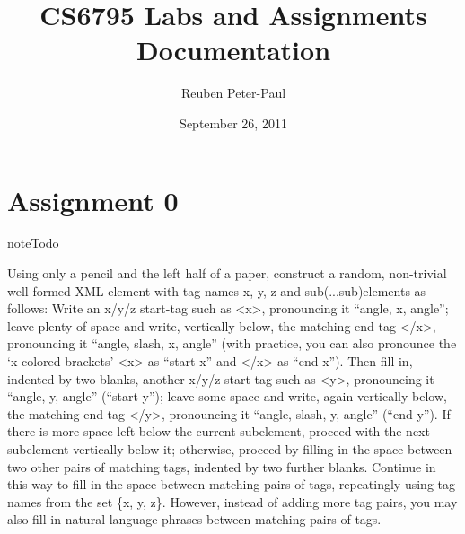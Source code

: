 \documentclass[letterpaper,10pt,english]{sphinxmanual}
\title{CS6795 Labs and Assignments Documentation}
\date{September 26, 2011}
\author{Reuben Peter-Paul}
\begin{document}
\maketitle
\tableofcontents
{}\label{index::doc}



\chapter{Assignment 0}
\label{assign0:cs6795-labs-and-assignments}\label{assign0:assignment-0}\label{assign0::doc}
\begin{notice}{note}{Todo}

Using only a pencil and the left half of a paper, construct a random, non-trivial well-formed XML element with tag names x, y, z and sub(...sub)elements as follows: Write an x/y/z start-tag such as \textless{}x\textgreater{}, pronouncing it ``angle, x, angle''; leave plenty of space and write, vertically below, the matching end-tag \textless{}/x\textgreater{}, pronouncing it ``angle, slash, x, angle'' (with practice, you can also pronounce the `x-colored brackets' \textless{}x\textgreater{} as ``start-x'' and \textless{}/x\textgreater{} as ``end-x''). Then fill in, indented by two blanks, another x/y/z start-tag such as \textless{}y\textgreater{}, pronouncing it ``angle, y, angle'' (``start-y''); leave some space and write, again vertically below, the matching end-tag \textless{}/y\textgreater{}, pronouncing it ``angle, slash, y, angle'' (``end-y''). If there is more space left below the current subelement, proceed with the next subelement vertically below it; otherwise, proceed by filling in the space between two other pairs of matching tags, indented by two further blanks. Continue in this way to fill in the space between matching pairs of tags, repeatingly using tag names from the set \{x, y, z\}. However, instead of adding more tag pairs, you may also fill in natural-language phrases between matching pairs of tags.
\end{notice}
\end{document}
